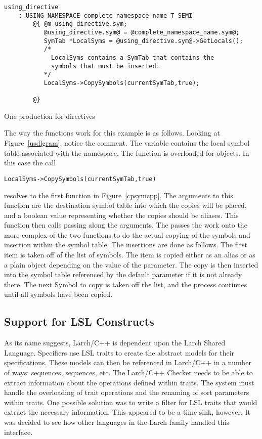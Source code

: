 \begin{BFIGURE}
\begin{verbatim}
using_directive
    : USING NAMESPACE complete_namespace_name T_SEMI
        @{ @m using_directive.sym;
           @using_directive.sym@ = @complete_namespace_name.sym@;
           SymTab *LocalSyms = @using_directive.sym@->GetLocals();
           /*
             LocalSyms contains a SymTab that contains the
             symbols that must be inserted.
           */
           LocalSyms->CopySymbols(currentSymTab,true);

        @}
\end{verbatim}
\caption{One production for  directives}
\label{usdlgram}
\end{BFIGURE}
The way the functions work for this example is as follows. Looking at
Figure~\ref{usdlgram}, notice the comment. The 
variable contains the local symbol table associated with the
namespace. The function  is overloaded for
 objects. In this case the call
\begin{verbatim}
LocalSyms->CopySymbols(currentSymTab,true)
\end{verbatim}
 resolves to the first function in Figure~\ref{cpsymcpp}. The arguments
to this function are the destination symbol table into which the
copies will be placed, and a boolean value representing whether the
copies should be aliases. This function then calls
 passing along the
arguments. The  passes the work onto the
more complex of the two  functions to do
the actual copying of the symbols and insertion within the symbol
table. The insertions are done as follows. The first item is taken off
of the list of symbols. The item is copied either as an alias or as a
plain
 object depending on the value of the
 parameter. The 
copy is then inserted into the symbol table referenced by the default
parameter if it is not already there. The next Symbol to copy is taken
off the list, and the process continues until all symbols have been
copied.

\subsection{Support for LSL Constructs}
As its name suggests, Larch/C++ is dependent upon the Larch Shared
Language. Specifiers use LSL traits to create the abstract models for
their specifications. These models can then be referenced in Larch/C++
in a number of ways:  sequences, 
sequences, etc. The Larch/C++ Checker needs to be able to extract
information about the operations defined within traits. The system
must handle the overloading of trait operations and the renaming of
sort parameters within traits. One possible solution was to write a
filter for LSL traits that would extract the necessary
information. This appeared to be a time sink, however. It was decided
to see how other languages in the Larch family handled this interface.

